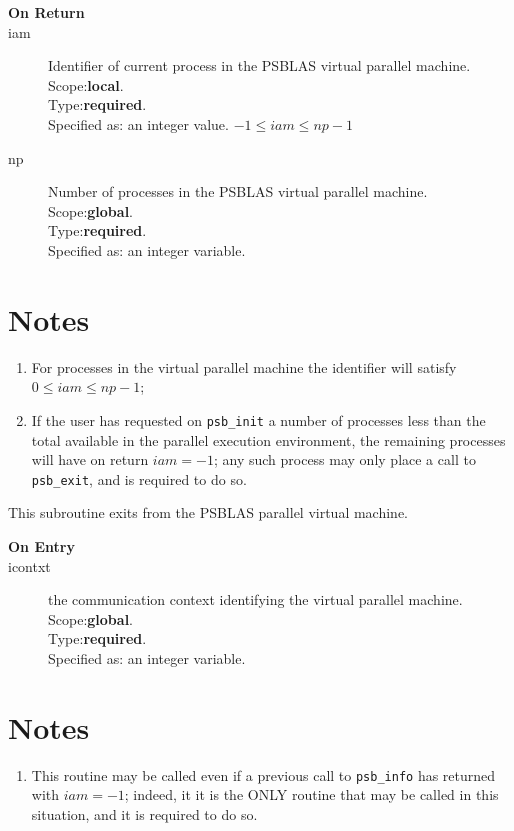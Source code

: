 \begin{description}
\item[\bf On Return]
\item[iam] Identifier of current  process in the PSBLAS virtual parallel machine.\\
Scope:{\bf local}.\\
Type:{\bf required}.\\
Specified as: an integer value. $-1 \le iam \le np-1$\
\item[np] Number of processes in the PSBLAS virtual parallel machine.\\
Scope:{\bf global}.\\
Type:{\bf required}.\\
Specified as: an integer variable. \
\end{description}


\section*{Notes}
\begin{enumerate}
\item For processes in the virtual parallel machine  the identifier
  will satisfy $0 \le iam \le np-1$;
\item If the user has requested on \verb|psb_init| a number of
  processes less than the total available in the parallel execution
  environment, the remaining processes will have on return $iam=-1$;
  any such process may  only place a call to \verb|psb_exit|, and is
  required to do so.
\end{enumerate}




This subroutine exits from the  PSBLAS parallel virtual  machine.
\begin{description}
\item[\bf  On Entry ]
\item[icontxt] the communication context identifying the virtual
  parallel machine.\\
Scope:{\bf global}.\\
Type:{\bf required}.\\
Specified as: an integer variable.
\end{description}

\section*{Notes}
\begin{enumerate}
\item This routine may be called even if a previous call to
  \verb|psb_info| has returned with $iam=-1$; indeed, it it is the ONLY
  routine that may be called in this situation, and it is required to
  do so.
\end{enumerate}



